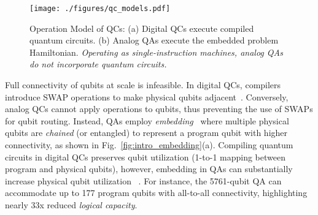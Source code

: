 \begin{figure}[htb]
    \centering
      \texttt{[image: ./figures/qc\_models.pdf]}
    \caption{
        Operation Model of QCs: 
        (a) Digital QCs execute compiled quantum circuits.  
        (b) Analog QAs execute the embedded problem Hamiltonian. 
        \emph{Operating as single-instruction machines, analog QAs do not incorporate quantum circuits.} 
}       
    \label{fig:QC_operation_models}
\end{figure}  




Full connectivity of qubits at scale is infeasible. 
In digital QCs, compilers introduce SWAP operations to make physical qubits adjacent~\cite{zulehner2018efficient,murali2019noise,tannu2019not}. 
Conversely, analog QCs cannot apply operations to qubits, thus preventing the use of SWAPs for qubit routing.
Instead, QAs employ \emph{embedding}~\cite{zbinden2020embedding,pelofske20234,pelofske2019solving,pelofske2022solving,barbosa2021optimizing} 
where multiple physical qubits are \emph{chained} (or entangled) to represent a program qubit with higher connectivity, as shown in Fig.~\ref{fig:intro_embedding}(a).  
Compiling quantum circuits in digital QCs preserves qubit utilization (1-to-1 mapping between program and physical qubits), however, embedding in QAs can substantially increase physical qubit utilization ~\cite{ayanzadeh2022equal}. 
For instance, the 5761-qubit QA can accommodate up to 177 program qubits with all-to-all connectivity, highlighting nearly 33x reduced \emph{logical capacity}.



